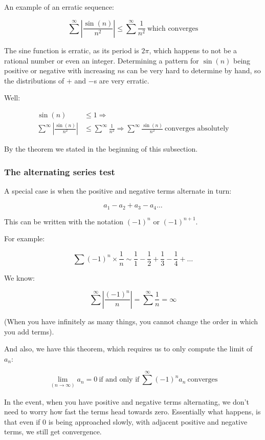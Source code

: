 \documentclass[12pt]{article}
\theoremstyle{plain}
\theoremstyle{remark}
\theoremstyle{definition}
\begin{document}
An example of an erratic sequence:

\[\sum_{}^{\infty}\left| \frac{\sin(n)}{n^{2}} \right| \leq \sum_{}^{\infty}\frac{1}{n^{2}}\ \text{which\ converges}\]

The sine function is erratic, as its period is \(2\pi\), which happens
to not be a rational number or even an integer. Determining a pattern
for \(\sin(n)\) being positive or negative with increasing \(n\)s can be
very hard to determine by hand, so the distributions of + and \(-\)s are
very erratic.

Well:

\begin{align*}
\sin(n) &\leq 1 \Rightarrow  \\
\sum_{}^{\infty}\left| \frac{\sin(n)}{n^{2}} \right| &\leq \sum_{}^{\infty}\frac{1}{n^{2}} \Rightarrow \sum_{}^{\infty}\frac{\sin(n)}{n^{2}}\ \text{converges\ absolutely}
\end{align*}


By the theorem we stated in the beginning of this subsection.


\subsubsection{The alternating series
test}

A special case is when the positive and negative terms alternate in
turn:

\[a_{1} - a_{2} + a_{3} - a_{4}\ldots\]

This can be written with the notation \(( - 1)^{n}\) or
\(( - 1)^{n + 1}\).

For example:

\[\sum( - 1)^{n} \times \frac{1}{n}\sim\frac{1}{1} - \frac{1}{2} + \frac{1}{3} - \frac{1}{4} + \ldots\]

We know:

\[\sum_{}^{\infty}\left| \frac{( - 1)^{n}}{n} \right| = \sum_{}^{\infty}\frac{1}{n} = \infty\]

(When you have infinitely as many things, you cannot change the order in
which you add terms).

And also, we have this theorem, which requires us to only compute the
limit of \(a_{n}\):

\[\lim_{(n \rightarrow \infty)}a_{n} = 0\ \text{if\ and\ only\ if}\ \sum_{}^{\infty}{( - 1)^{n}a_{n}}\ \text{converges}\]

In the event, when you have positive and negative terms alternating, we
don't need to worry how fast the terms head towards zero. Essentially
what happens, is that even if 0 is being approached slowly, with
adjacent positive and negative terms, we still get convergence.
\end{document}
